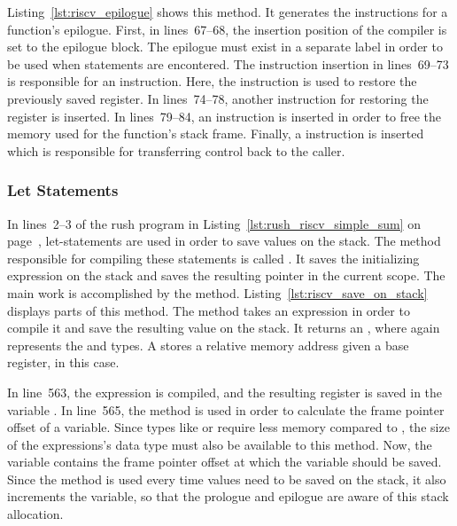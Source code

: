 
Listing~\ref{lst:riscv_epilogue} shows this  method.
It generates the instructions for a function's epilogue.
First, in lines~67--68, the insertion position of the compiler is set to the epilogue block.
The epilogue must exist in a separate label in order to be used when  statements are encontered.
The instruction insertion in lines~69--73 is responsible for an  instruction.
Here, the  instruction is used to restore the previously saved  register.
In lines~74--78, another  instruction for restoring the  register is inserted.
In lines~79--84, an  instruction is inserted in order to free the memory used for the function's stack frame.
Finally, a  instruction is inserted which is responsible for transferring control back to the caller.

\subsubsection{Let Statements}

In lines~2--3 of the rush program in Listing~\ref{lst:rush_riscv_simple_sum} on page~\pageref{lst:rush_riscv_simple_sum}, let-statements are used in order to save values on the stack.
The method responsible for compiling these statements is called .
It saves the initializing expression on the stack and saves the resulting pointer in the current scope.
The main work is accomplished by the  method.
Listing~\ref{lst:riscv_save_on_stack} displays parts of this method.
The method takes an expression in order to compile it and save the resulting value on the stack.
It returns an , where  again represents the \qVerb{!} and \qVerb{()} types.
A  stores a relative memory address given a base register,  in this case.


In line~563, the expression is compiled, and the resulting register is saved in the variable .
In line~565, the  method is used in order to calculate the frame pointer offset of a variable.
Since types like  or  require less memory compared to , the size of the expressions's data type must also be available to this method.
Now, the  variable contains the frame pointer offset at which the variable should be saved.
Since the  method is used every time values need to be saved on the stack,
it also increments the  variable, so that the prologue and epilogue are aware of this stack allocation.

